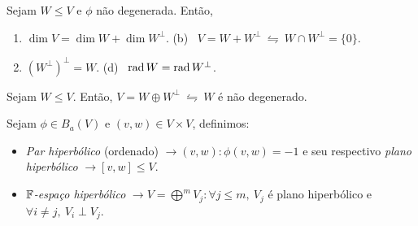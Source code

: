 \begin{proposition}
    \label{prop:941}
    Sejam \(W\leq V\) e \(\phi\) não degenerada. Então, 
    \vspace{-0.2cm}
    \begin{enumerate}[label = (\alph*), left = 0.6cm]
        \item \(\dim V = \dim W + \dim W^\perp\). \hspace{0.72cm}(b) \ \(V = W + W^\perp \ \leftrightharpoons \ W \cap W^\perp = \{0\}\). 
        \item[(c)] \((W^\perp)^\perp = W\). \hspace{3.64cm} (d) \ \(\operatorname{rad} W = \operatorname{rad} W^\perp\). 
    \end{enumerate}
\end{proposition}



\begin{proposition}
    \label{prop:943}
    Sejam \(W\leq V\). Então, \(V = W \oplus W^\perp \ \leftrightharpoons \ W\) é não degenerado.
\end{proposition}


\begin{definition}
    Sejam \(\phi \in B_a(V)\) e \((v,w) \in V \times V\), definimos:    
    \begin{itemize}[label = \(\star\), left = 1cm]
        \item \emph{Par hiperbólico} (ordenado) \(\rightarrow (v,w) : \phi(v,w)=-1\) e seu respectivo \emph{plano hiperbólico} \(\rightarrow [v,w] \leq V\). 
        \item \(\mathbb{F}\)\emph{-espaço hiperbólico} \(\rightarrow V = \bigoplus^m V_j: \forall j\leq m,\ V_j\) é plano hiperbólico e \(\forall i\neq j, \ V_i \perp V_j\).  
    \end{itemize}
\end{definition}

